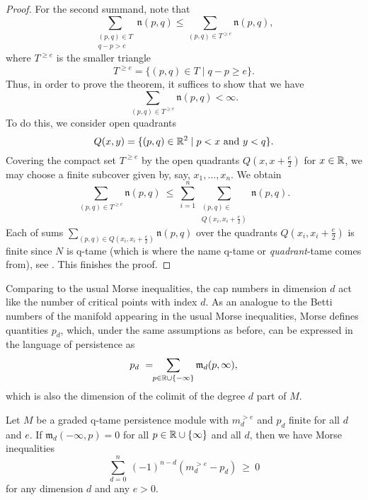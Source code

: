 \begin{proof}
    For the second summand, note that  
    \[
    \sum_{ \substack{ (p,q) \in T \\ q-p > e } } \mathfrak{n} (p,q)
    \leq
    \sum_{(p,q) \in T^{\geq e}} \mathfrak{n} (p,q),
    \]
    where $T^{\geq e}$ is the smaller triangle 
    \[
    T^{\geq e} = \{(p,q) \in T \mid q-p \geq e\}.
    \]
    Thus, in order to prove the theorem, it suffices to show that we have 
    \[
    \sum_{(p,q) \in T^{\geq e}} \mathfrak{n} (p,q) 
    < 
    \infty.
    \]
    To do this, we consider open quadrants 
    \[
    Q(x, y) = \{ (p, q) \in \mathbb{R}^2 \mid p < x \text{ and } y < q \}.
    \]
    Covering the compact set $T^{\geq e}$ by the open quadrants $Q \left(x, x + \frac{e}{2} \right)$ for $x \in \mathbb{R}$, we may choose a finite subcover given by, say, $x_1,\dots, x_n$. We obtain
    \[
    \sum_{(p,q) \in T^{\geq e}} \mathfrak{n} (p,q) 
    \ \leq \
    \sum_{i=1}^n \sum_{\substack{(p, q) \in \\ Q (x_i, x_i + \frac{e}{2})}} \mathfrak{n}(p,q). 
    \]
    Each of sums $\sum_{(p,q) \in Q \left(x_i, x_i + \frac{e}{2} \right)} \mathfrak{n}(p,q)$ over the quadrants $Q \left(x_i, x_i + \frac{e}{2} \right)$ is finite since $N$ is q-tame (which is where the name q-tame or \emph{quadrant}-tame comes from), see \cite[Section 3.8]{Chazal.2016a}. This finishes the proof.
\end{proof}


Comparing to the usual Morse inequalities, the cap numbers in dimension $d$ act like the number of critical points with index $d$. As an analogue to the Betti numbers of the manifold appearing in the usual Morse inequalities, Morse defines quantities $p_{d}$, which, under the same assumptions as before, can be expressed in the language of persistence as
\[
p_{d} \ = \!\! \sum_{p \in \mathbb{R} \cup \{-\infty\}} \mathfrak{m}_d(p,\infty),
\]
which is also the dimension of the colimit of the degree $d$ part of $M$.

\begin{thm}
    Let $M$ be a graded q-tame persistence module with $m_{d}^{> e }$ and $p_{d}$ finite for all $d$ and $e$. If $\mathfrak{m}_d(-\infty, p) = 0$ for all $p \in \mathbb{R} \cup \{\infty\}$ and all $d$, then we have Morse inequalities
    \begin{equation} \label{e:morse inequalities}
        \sum_{d=0}^n \ (-1)^{n-d} (m^{>e}_{d} - p_{d}) \ \geq\  0
    \end{equation}
    for any dimension $d$ and any $e > 0$.
\end{thm}


